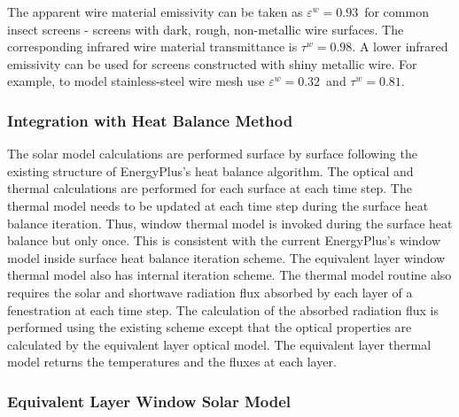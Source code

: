 {The apparent wire material emissivity can be taken as $\varepsilon^w = 0.93$\ for common insect screens - screens with dark, rough, non-metallic wire surfaces. The corresponding infrared wire material transmittance is $\tau^w = 0.98$. A lower infrared emissivity can be used for screens constructed with shiny metallic wire. For example, to model stainless-steel wire mesh use $\varepsilon^w = 0.32$\ and $\tau^w = 0.81$.

\subsubsection{Integration with Heat Balance Method}\label{integration-with-heat-balance-method}

The solar model calculations are performed surface by surface following the existing structure of EnergyPlus's heat balance algorithm. The optical and thermal calculations are performed for each surface at each time step. The thermal model needs to be updated at each time step during the surface heat balance iteration. Thus, window thermal model is invoked during the surface heat balance but only once. This is consistent with the current EnergyPlus's window model inside surface heat balance iteration scheme. The equivalent layer window thermal model also has internal iteration scheme. The thermal model routine also requires the solar and shortwave radiation flux absorbed by each layer of a fenestration at each time step. The calculation of the absorbed radiation flux is performed using the existing scheme except that the optical properties are calculated by the equivalent layer optical model. The equivalent layer thermal model returns the temperatures and the fluxes at each layer.

\subsubsection{Equivalent Layer Window Solar Model}\label{equivalent-layer-window-solar-model}

}
